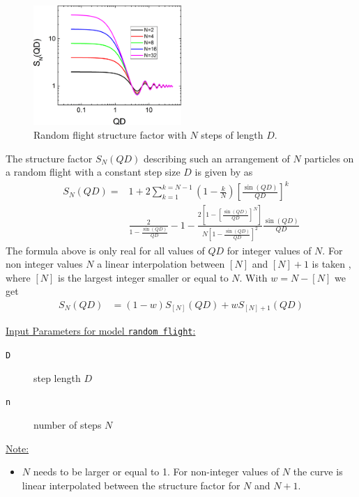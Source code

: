 \begin{figure}[htb]
\begin{center}
\includegraphics[width=0.5\textwidth]{../images/structure_factor/randomflight.png}
\end{center}
\caption{Random flight structure factor with $N$ steps of length $D$.}
\label{fig:randomflight}
\end{figure}

The structure factor $S_N(QD)$ describing such an arrangement of $N$ particles on a random flight
with a constant step size $D$ is given by \cite{Burchard1970} as
\begin{align}
S_N(QD)=& 1+2\sum_{k=1}^{k=N-1}\left(1-\frac{k}{N}\right)\left[\frac{\sin(QD)}{QD}\right]^k \\
    &\frac{2}{1-\frac{\sin(QD)}{QD}}-1-\frac{2\left[1-\left[\frac{\sin(QD)}{QD}\right]^N\right]}{N\left[1-\frac{\sin(QD)}{QD}\right]^2}\frac{\sin(QD)}{QD}
\end{align}
The formula above is only real for all values of $QD$ for integer values of $N$. For non integer values $N$ a linear interpolation between $[N]$ and $[N]+1$ is taken \cite{Giehm2010}, where $[N]$ is the largest integer smaller or equal to $N$. With $w=N-[N]$ we get
\begin{align}
S_N(QD)&= (1-w)S_{[N]}(QD) + wS_{[N]+1}(QD)
\end{align}

\noindent \uline{Input Parameters for model \texttt{random flight}:}\\
\begin{description}
\item[\texttt{D}] step length $D$
\item[\texttt{n}] number of steps $N$
\end{description}


\noindent\uline{Note:}
\begin{itemize}
\item $N$ needs to be larger or equal to 1. For non-integer values of $N$ the curve is linear interpolated between the structure factor for $N$ and $N+1$.
\end{itemize}

